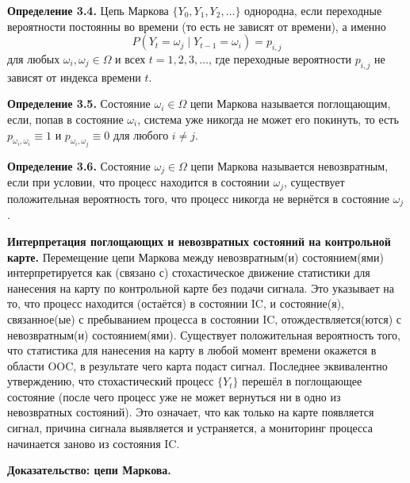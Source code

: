 \noindent\textbf{Определение 3.4.} Цепь Маркова \(\{Y_0, Y_1, Y_2, \ldots\}\) однородна, если переходные вероятности постоянны во времени (то есть не зависят от времени), а именно
\[
	P(Y_t = \omega_j \mid Y_{t-1} = \omega_i) = p_{i,j}
\]
для любых \(\omega_i, \omega_j \in \Omega\) и всех \(t = 1, 2, 3, \ldots\), где переходные вероятности \(p_{i,j}\) не зависят от индекса времени \(t\).

\noindent\textbf{Определение 3.5.} Состояние \(\omega_i \in \Omega\) цепи Маркова называется поглощающим, если, попав в состояние \(\omega_i\), система уже никогда не может его покинуть, то есть \(p_{\omega_i,\omega_i} \equiv 1\) и \(p_{\omega_i,\omega_j} \equiv 0\) для любого \(i \ne j\).

\noindent\textbf{Определение 3.6.} Состояние \(\omega_j \in \Omega\) цепи Маркова называется невозвратным, если при условии, что процесс находится в состоянии \(\omega_j\), существует положительная вероятность того, что процесс никогда не вернётся в состояние \(\omega_j\).

\noindent\textbf{Интерпретация поглощающих и невозвратных состояний на контрольной карте.} Перемещение цепи Маркова между невозвратным(и) состоянием(ями) интерпретируется как (связано с) стохастическое движение статистики для нанесения на карту по контрольной карте без подачи сигнала. Это указывает на то, что процесс находится (остаётся) в состоянии IC, и состояние(я), связанное(ые) с пребыванием процесса в состоянии IC, отождествляется(ются) с невозвратным(и) состоянием(ями). Существует положительная вероятность того, что статистика для нанесения на карту в любой момент времени окажется в области OOC, в результате чего карта подаст сигнал. Последнее эквивалентно утверждению, что стохастический процесс \(\{Y_t\}\) перешёл в поглощающее состояние (после чего процесс уже не может вернуться ни в одно из невозвратных состояний). Это означает, что как только на карте появляется сигнал, причина сигнала выявляется и устраняется, а мониторинг процесса начинается заново из состояния IC.

\noindent\textbf{Доказательство: цепи Маркова.}

